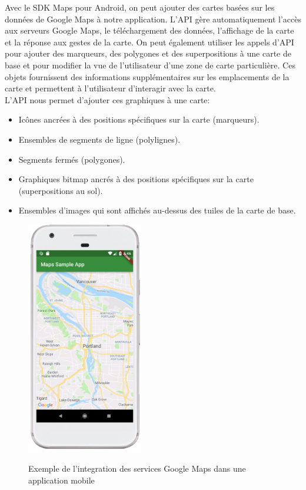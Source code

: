 Avec le SDK Maps pour Android, on peut ajouter des cartes basées
sur les données de Google Maps à notre application.
L'API gère automatiquement l'accès aux serveurs Google Maps, le
téléchargement des données, l'affichage de la carte et la réponse aux
gestes de la carte. On peut également utiliser les appels d'API pour
ajouter des marqueurs, des polygones et des superpositions à une carte de
base et pour modifier la vue de l'utilisateur d'une zone de carte
particulière. Ces objets fournissent des informations supplémentaires
sur les emplacements de la carte et permettent à l'utilisateur d'interagir
avec la carte.
\\
L'API nous permet d'ajouter ces graphiques à une carte:
\begin{itemize}
    \item Icônes ancrées à des positions spécifiques sur la carte (marqueurs).
    \item Ensembles de segments de ligne (polylignes).
    \item Segments fermés (polygones).
    \item Graphiques bitmap ancrés à des positions spécifiques sur la carte (superpositions au sol).
    \item Ensembles d'images qui sont affichés au-dessus des tuiles de la carte de base.
\end{itemize}
\begin{figure}[!h]

    \centering
    \includegraphics[width=2in]{images/Chapitre2/GoogleMapsMobile.png}
    \label{fig:GoogleMapsMobile}
    \caption{Exemple de l'integration des services Google Maps dans une application mobile}
\end{figure}
